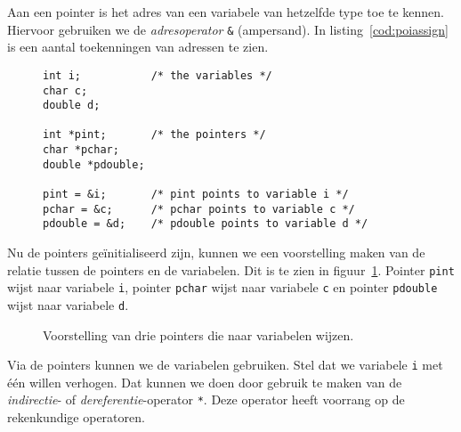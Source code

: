 Aan een pointer is het adres van een variabele van hetzelfde type toe te kennen. Hiervoor gebruiken we de \textsl{adresoperator} \texttt{\&} (ampersand). In listing~\ref{cod:poiassign} is een aantal toekenningen van adressen te zien.

\begin{figure}[H]
\begin{lstlisting}[caption=Enkele toekenningen van adressen aan pointers.,label=cod:poiassign]
int i;           /* the variables */
char c;
double d;

int *pint;       /* the pointers */
char *pchar;
double *pdouble;

pint = &i;       /* pint points to variable i */
pchar = &c;      /* pchar points to variable c */
pdouble = &d;    /* pdouble points to variable d */
\end{lstlisting}
\end{figure}

Nu de pointers geïnitialiseerd zijn, kunnen we een voorstelling maken van de relatie tussen de pointers en de variabelen. Dit is te zien in figuur~\ref{fig:poivoorstelling2}. Pointer \texttt{pint} wijst naar variabele \texttt{i}, pointer \texttt{pchar} wijst naar variabele \texttt{c} en pointer \texttt{pdouble} wijst naar variabele \texttt{d}.

\begin{figure}[!ht]
\centering
{}
\caption{Voorstelling van drie pointers die naar variabelen wijzen.}
\label{fig:poivoorstelling2}
\end{figure}

Via de pointers kunnen we de variabelen gebruiken. Stel dat we variabele \texttt{i} met één willen verhogen. Dat kunnen we doen door gebruik te maken van de \textsl{indirectie}- of \textsl{dereferentie}-operator \texttt{*}. Deze operator heeft voorrang op de rekenkundige operatoren.

